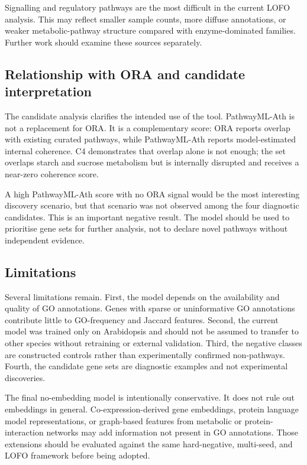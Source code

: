 \documentclass[11pt]{article}
\begin{document}
Signalling and regulatory pathways are the most difficult in the current LOFO analysis. This may reflect smaller sample counts, more diffuse annotations, or weaker metabolic-pathway structure compared with enzyme-dominated families. Further work should examine these sources separately.

\subsection{Relationship with ORA and candidate interpretation}
The candidate analysis clarifies the intended use of the tool. PathwayML-Ath is not a replacement for ORA. It is a complementary score: ORA reports overlap with existing curated pathways, while PathwayML-Ath reports model-estimated internal coherence. C4 demonstrates that overlap alone is not enough; the set overlaps starch and sucrose metabolism but is internally disrupted and receives a near-zero coherence score.

A high PathwayML-Ath score with no ORA signal would be the most interesting discovery scenario, but that scenario was not observed among the four diagnostic candidates. This is an important negative result. The model should be used to prioritise gene sets for further analysis, not to declare novel pathways without independent evidence.

\subsection{Limitations}
Several limitations remain. First, the model depends on the availability and quality of GO annotations. Genes with sparse or uninformative GO annotations contribute little to GO-frequency and Jaccard features. Second, the current model was trained only on Arabidopsis and should not be assumed to transfer to other species without retraining or external validation. Third, the negative classes are constructed controls rather than experimentally confirmed non-pathways. Fourth, the candidate gene sets are diagnostic examples and not experimental discoveries.

The final no-embedding model is intentionally conservative. It does not rule out embeddings in general. Co-expression-derived gene embeddings, protein language model representations, or graph-based features from metabolic or protein-interaction networks may add information not present in GO annotations. Those extensions should be evaluated against the same hard-negative, multi-seed, and LOFO framework before being adopted.
\end{document}
